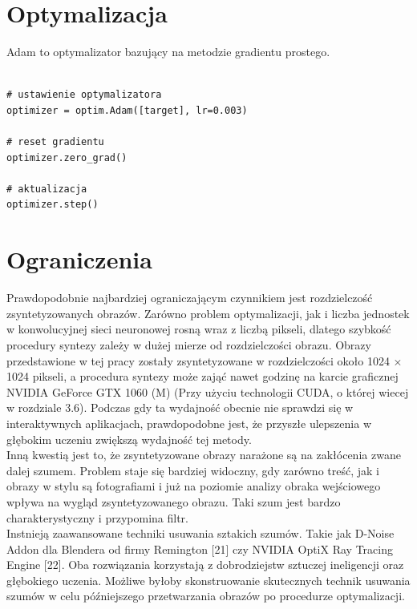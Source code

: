 \documentclass[brudnopis]{xmgr}
\begin{document}
\section{Optymalizacja\label{s:dsssl}}

Adam to optymalizator bazujący na metodzie gradientu prostego.

\begin{lstlisting}

# ustawienie optymalizatora
optimizer = optim.Adam([target], lr=0.003)
      
# reset gradientu
optimizer.zero_grad()
      
# aktualizacja
optimizer.step()

\end{lstlisting}

						
\section{Ograniczenia\label{s:dsssl}}

Prawdopodobnie najbardziej ograniczającym czynnikiem jest rozdzielczość zsyntetyzowanych obrazów. Zarówno problem optymalizacji, jak i liczba jednostek w konwolucyjnej sieci neuronowej rosną wraz z liczbą pikseli, dlatego szybkość procedury syntezy zależy w dużej mierze od rozdzielczości obrazu. Obrazy przedstawione w tej pracy zostały zsyntetyzowane w rozdzielczości około 1024 × 1024 pikseli, a procedura syntezy może zająć nawet godzinę na karcie graficznej NVIDIA GeForce GTX 1060 (M) (Przy użyciu technologii CUDA, o której wiecej w rozdziale 3.6). Podczas gdy ta wydajność obecnie nie sprawdzi się w interaktywnych aplikacjach, prawdopodobne jest, że przyszłe ulepszenia w głębokim uczeniu zwiększą wydajność tej metody.
\\

Inną kwestią jest to, że zsyntetyzowane obrazy narażone są na zakłócenia zwane dalej szumem.  Problem staje się bardziej widoczny, gdy zarówno treść, jak i obrazy w stylu są fotografiami i już na poziomie analizy obraka wejściowego wpływa na wygląd zsyntetyzowanego obrazu. Taki szum jest bardzo charakterystyczny i przypomina filtr. 
\\

Instnieją zaawansowane techniki usuwania sztakich szumów. Takie jak D-Noise Addon dla Blendera od firmy Remington [21] czy NVIDIA OptiX Ray Tracing Engine [22]. Oba rozwiązania korzystają z dobrodziejstw sztuczej ineligencji oraz głębokiego uczenia. Możliwe byłoby skonstruowanie skutecznych technik usuwania szumów w celu późniejszego przetwarzania obrazów po procedurze optymalizacji.
 \\
\end{document}
